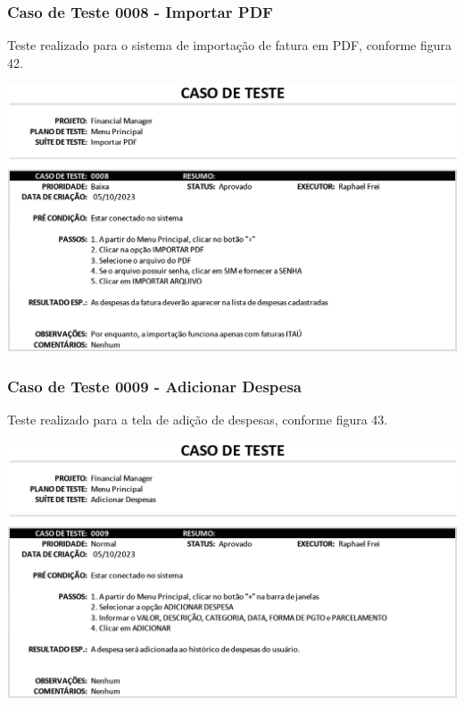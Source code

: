 \subsubsection{Caso de Teste 0008 - Importar PDF}

Teste realizado para o sistema de importação de fatura em PDF, conforme figura 42.

    \begin{center}
        \begin{minipage}{\textwidth}
            \centering
            \includegraphics[scale=0.8]{figs/caso-testes-0008.png}
            \label{fig:figura42}
        \end{minipage}
    \end{center} 

\subsubsection{Caso de Teste 0009 - Adicionar Despesa}

Teste realizado para a tela de adição de despesas, conforme figura 43.

    \begin{center}
        \begin{minipage}{\textwidth}
            \centering
            \includegraphics[scale=0.8]{figs/caso-testes-0009.png}
            \label{fig:figura43}
        \end{minipage}
    \end{center} 

